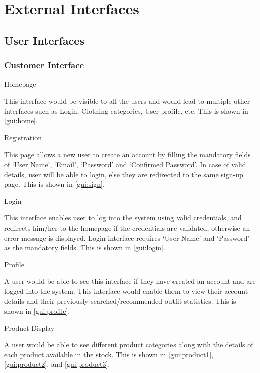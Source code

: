\section{External Interfaces}

\subsection{User Interfaces}

\subsubsection{Customer Interface}

\FloatBarrier
\begin{outline}
  \1 Homepage
  
  This interface would be visible to all the users and would lead to multiple other interfaces such as Login, Clothing categories, User profile, etc. This is shown in \autoref{gui:home}.


    
  \1 Registration
  
  This page allows a new user to create an account by filling the mandatory fields of `User Name', `Email', `Password' and `Confirmed Password'. In case of valid details, user will be able to login, else they are redirected to the same sign-up page. This is shown in \autoref{gui:sign}.


    
  \1 Login
  
  This interface enables user to log into the system using valid credentials, and redirects him/her to the homepage if the credentials are validated, otherwise an error message is displayed. Login interface requires `User Name' and `Password' as the mandatory fields. This is shown in \autoref{gui:login}.


  \1 Profile
  
  A user would be able to see this interface if they have created an account and are logged into the system. This interface would enable them to view their account details and their previously searched/recommended outfit statistics. This is shown in \autoref{gui:profile}.


  \1 Product Display
  
  A user would be able to see different product categories along with the details of each product available in the stock. This is shown in \autoref{gui:product1}, \autoref{gui:product2}, and \autoref{gui:product3}.
  


\end{outline}

